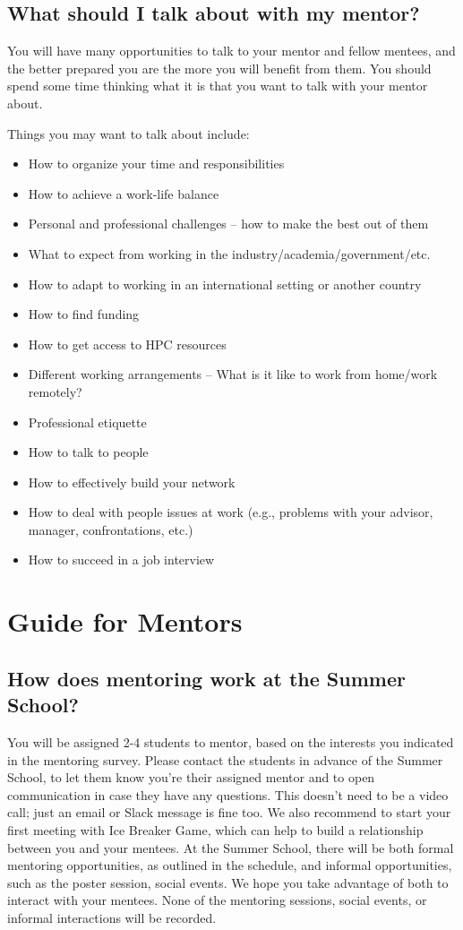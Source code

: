 \documentclass[titlepage]{article}
\let\oldsection\section
\renewcommand{\section}{\clearpage\oldsection}
\begin{document}
\subsection{What should I talk about with my mentor?}
\label{sec:orgf23ff78}
You will have many opportunities to talk to your mentor and fellow mentees, and the better prepared you are the more you will benefit from them. You should spend some time thinking what it is that you want to talk with your mentor about.

Things you may want to talk about include:

\begin{itemize}
\item How to organize your time and responsibilities
\item How to achieve a work-life balance
\item Personal and professional challenges – how to make the best out of them
\item What to expect from working in the industry/academia/government/etc.
\item How to adapt to working in an international setting or another country
\item How to find funding
\item How to get access to HPC resources
\item Different working arrangements – What is it like to work from home/work remotely?
\item Professional etiquette
\item How to talk to people
\item How to effectively build your network
\item How to deal with people issues at work (e.g., problems with your advisor, manager, confrontations, etc.)
\item How to succeed in a job interview
\end{itemize}

\section{Guide for Mentors}
\label{sec:org702e147}
\subsection{How does mentoring work at the Summer School?}
\label{sec:org6c7b8b3}
You will be assigned 2-4 students to mentor, based on the interests you indicated in the mentoring survey. Please contact the students in advance of the Summer School, to let them know you're their assigned mentor and to open communication in case they have any questions. This doesn't need to be a video call; just an email or Slack message is fine too. We also recommend to start your first meeting with Ice Breaker Game, which can help to build a relationship between you and your mentees.
At the Summer School, there will be both formal mentoring opportunities, as outlined in the schedule, and informal opportunities, such as the poster session, social events.  We hope you take advantage of both to interact with your mentees. None of the mentoring sessions, social events, or informal interactions will be recorded.
\end{document}
